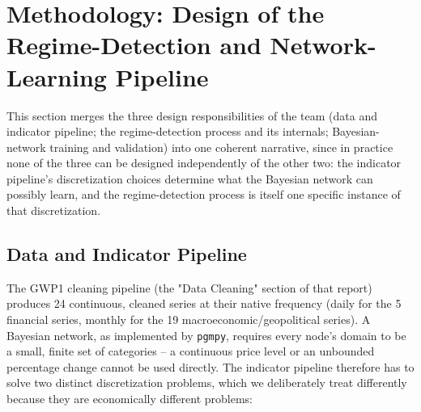 \section{Methodology: Design of the Regime-Detection and Network-Learning Pipeline}
\label{sec:methodology-design}

This section merges the three design responsibilities of the team (data
and indicator pipeline; the regime-detection process and its internals;
Bayesian-network training and validation) into one coherent narrative,
since in practice none of the three can be designed independently of the
other two: the indicator pipeline's discretization choices determine
what the Bayesian network can possibly learn, and the regime-detection
process is itself one specific instance of that discretization.

\subsection{Data and Indicator Pipeline}
\label{sec:data-indicator-pipeline}

The GWP1 cleaning pipeline (the "Data Cleaning" section of that
report) produces 24 continuous, cleaned series at their native
frequency (daily for the 5 financial series, monthly for the 19
macroeconomic/geopolitical series). A Bayesian network, as implemented
by \texttt{pgmpy}, requires every node's domain to be a small, finite set
of categories -- a continuous price level or an unbounded percentage
change cannot be used directly. The indicator pipeline therefore has to
solve two distinct discretization problems, which we deliberately treat
differently because they are economically different problems:

